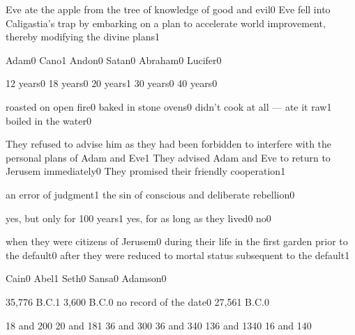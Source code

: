 {Eve ate the apple from the tree of knowledge of good and evil}{0}
{Eve fell into Caligastia's trap by embarking on a plan to accelerate world improvement, thereby modifying the divine plans}{1}
\qstop

{Adam}{0}
{Cano}{1}
{Andon}{0}
{Satan}{0}
{Abraham}{0}
{Lucifer}{0}
\qstop

{12 years}{0}
{18 years}{0}
{20 years}{1}
{30 years}{0}
{40 years}{0}
\qstop

{roasted on open fire}{0}
{baked in stone ovens}{0}
{didn't cook at all --- ate it raw}{1}
{boiled in the water}{0}
\qstop

{They refused to advise him as they had been forbidden to interfere with the personal plans of Adam and Eve}{1}
{They advised Adam and Eve to return to Jerusem immediately}{0}
{They promised their friendly cooperation}{1}
\qstop


{an error of judgment}{1}
{the sin of conscious and deliberate rebellion}{0}
\qstop

{yes, but only for 100 years}{1}
{yes, for as long as they lived}{0}
{no}{0}
\qstop

{when they were citizens of Jerusem}{0}
{during their life in the first garden prior to the default}{0}
{after they were reduced to mortal status subsequent to the default}{1}
\qstop

{Cain}{0}
{Abel}{1}
{Seth}{0}
{Sansa}{0}
{Adamson}{0}
\qstop

{35,776 B.C.}{1}
{3,600 B.C.}{0}
{no record of the date}{0}
{27,561 B.C.}{0}
\qstop

{18 and 20}{0}
{20 and 18}{1}
{36 and 30}{0}
{36 and 34}{0}
{136 and 134}{0}
{16 and 14}{0}
\qstop

